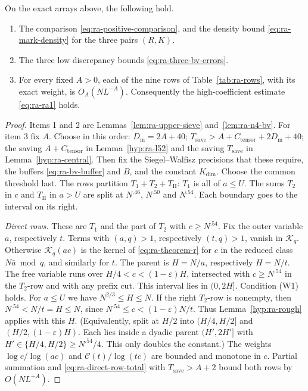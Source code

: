 \begin{proposition}\label{hyp:ra-applications}
On the exact arrays above, the following hold.
\begin{enumerate}
 \item The comparison \eqref{eq:ra-positive-comparison}, and the density
 bound \eqref{eq:ra-mark-density} for the three pairs \((R,K)\).
 \item The three low discrepancy bounds \eqref{eq:ra-three-bv-errors}.
 \item For every fixed \(A>0\), each of the nine rows of
 Table~\ref{tab:ra-rows}, with its exact weight, is \(O_A(NL^{-A})\).
 Consequently the high-coefficient estimate \eqref{eq:ra-ra1} holds.
\end{enumerate}
\end{proposition}
\begin{proof}
Items 1 and 2 are Lemmas~\ref{lem:ra-upper-sieve} and~\ref{lem:ra-n4-bv}.
For item 3 fix \(A\). Choose in this order: \(D_{\mathrm m}=2A+40\);
\(T_{\mathrm{save}}>A+C_{\mathrm{tensor}}+2D_{\mathrm m}+40\); the saving \(A+C_{\mathrm{tensor}}\) in
Lemma~\ref{hyp:ra-l52} and the saving \(T_{\mathrm{save}}\) in Lemma~\ref{hyp:ra-central}.
Then fix the Siegel--Walfisz precisions that these require, the buffers
\eqref{eq:ra-bv-buffer} and \(B\), and the constant \(K_{\mathrm{dim}}\).
Choose the common threshold last. The rows partition \(T_1+T_2+T_{\mathrm{II}}\):
\(T_1\) is all of \(a\le U\). The sums \(T_2\) in \(c\) and \(T_{\mathrm{II}}\)
in \(a>U\) are split at \(N^{.46}\), \(N^{.50}\) and \(N^{.54}\).
Each boundary goes to the interval on its right.

\emph{Direct rows.} These are \(T_1\) and the part of \(T_2\) with
\(c\ge N^{.54}\). Fix the outer variable \(a\), respectively \(t\). Terms
with \((a,q)>1\), respectively \((t,q)>1\), vanish in \(\mathcal K_q\).
Otherwise \(\mathcal K_q(ac)\) is the kernel of \eqref{eq:ra-theorem-r} for
\(c\) in the reduced class \(N\bar a\bmod q\), and similarly for \(t\). The
parent is \(H=N/a\), respectively \(H=N/t\). The free variable runs over
\(H/4<c<(1-\varepsilon)H\), intersected with \(c\ge N^{.54}\) in the
\(T_2\)-row and with any prefix cut.
This interval lies in \((0,2H]\).
Condition (W1) holds.
For \(a\le U\) we have \(N^{2/3}\le H\le N\).
If the right \(T_2\)-row is nonempty, then
\(N^{.54}<N/t=H\le N\), since
\(N^{.54}\le c<(1-\varepsilon)N/t\). Thus Lemma~\ref{hyp:ra-rough} applies
with this \(H\). (Equivalently, split at \(H/2\) into
\((H/4,H/2]\) and \((H/2,(1-\varepsilon)H)\).
Each lies inside a dyadic parent
\((H',2H']\) with \(H'\in\{H/4,H/2\}\ge N^{.54}/4\). This only doubles the
constant.) The weights
\(\log c/\log(ac)\) and \(\mathcal C(t)/\log(tc)\) are bounded and
monotone in \(c\). Partial summation and \eqref{eq:ra-direct-row-total}
with \(T_{\mathrm{save}}>A+2\) bound both rows by \(O(NL^{-A})\).


\end{proof}
